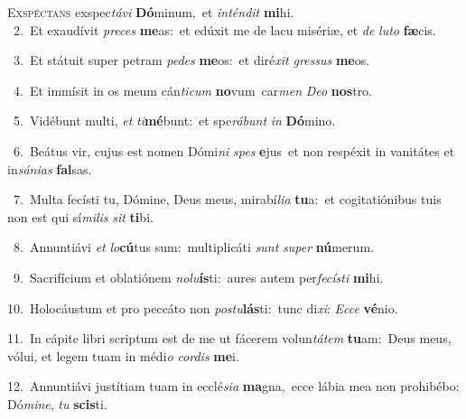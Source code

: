 \lettrine{\initial\textcolor{\initialcolor}{E}}{xspéctans} exspec\-\textit{tá}\-\textit{vi} \textbf{Dó}\-minum,~\star et \textit{in}\-\textit{tén}\textit{dit} \textbf{mi}\-hi.\\
{\numbfont\textcolor{\numbcolor}{~2.}}~Et exaudívit \textit{pre}\-\textit{ces} \textbf{me}\-as:~\star et edúxit me de lacu misériæ, et \textit{de} \textit{lu}\-\textit{to} \textbf{fæ}\-cis.\par
{\numbfont\textcolor{\numbcolor}{~3.}}~Et státuit super petram \textit{pe}\-\textit{des} \textbf{me}\-os:~\star et diré\textit{xit} \textit{gres}\-\textit{sus} \textbf{me}\-os.\par
{\numbfont\textcolor{\numbcolor}{~4.}}~Et immísit in os meum cán\-\textit{ti}\-\textit{cum} \textbf{no}\-vum~\star car\textit{men} \textit{De}\-\textit{o} \textbf{nos}\-tro.\par
{\numbfont\textcolor{\numbcolor}{~5.}}~Vidébunt multi, \textit{et} \textit{ti}\-\textbf{mé}bunt:~\star et spe\-\textit{rá}\-\textit{bunt} \textit{in} \textbf{Dó}\-mino.\par
{\numbfont\textcolor{\numbcolor}{~6.}}~Beátus vir, cujus est nomen Dómi\textit{ni} \textit{spes} \textbf{e}\-jus~\star et non respéxit in vanitátes et in\-\textit{sá}\-\textit{ni}\textit{as} \textbf{fal}\-sas.\par
{\numbfont\textcolor{\numbcolor}{~7.}}~Multa fecísti tu, Dómine, Deus meus, mirabí\-\textit{li}\-\textit{a} \textbf{tu}\-a:~\star et cogitatiónibus tuis non est qui sí\-\textit{mi}\-\textit{lis} \textit{sit} \textbf{ti}\-bi.\par
{\numbfont\textcolor{\numbcolor}{~8.}}~Annuntiávi \textit{et} \textit{lo}\-\textbf{cú}tus sum:~\star multiplicáti \textit{sunt} \textit{su}\-\textit{per} \textbf{nú}\-merum.\par
{\numbfont\textcolor{\numbcolor}{~9.}}~Sacrifícium et oblatiónem \textit{no}\-\textit{lu}\textbf{ís}ti:~\star aures autem per\-\textit{fe}\-\textit{cís}\textit{ti} \textbf{mi}\-hi.\par
{\numbfont\textcolor{\numbcolor}{10.}}~Holocáustum et pro peccáto non \textit{pos}\-\textit{tu}\textbf{lás}ti:~\star tunc di\-\textit{xi}\-: \textit{Ec}\-\textit{ce} \textbf{vé}\-nio.\par
{\numbfont\textcolor{\numbcolor}{11.}}~In cápite libri scriptum est de me ut fácerem volun\-\textit{tá}\-\textit{tem} \textbf{tu}\-am:~\star Deus meus, vólui, et legem tuam in médi\textit{o} \textit{cor}\-\textit{dis} \textbf{me}\-i.\par
{\numbfont\textcolor{\numbcolor}{12.}}~Annuntiávi justítiam tuam in ecclé\-\textit{si}\-\textit{a} \textbf{ma}\-gna,~\star ecce lábia mea non prohibébo: Dó\-\textit{mi}\-\textit{ne}, \textit{tu} \textbf{scis}\-ti.\par
